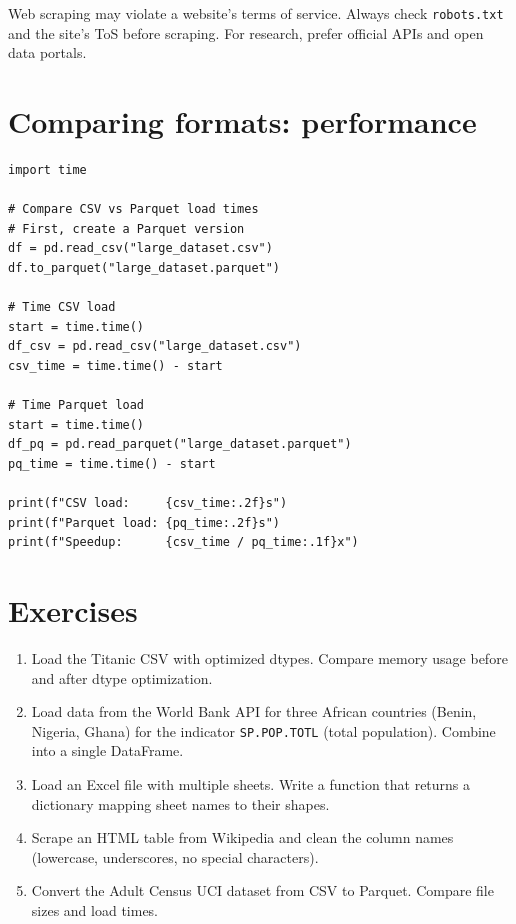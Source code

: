 \begin{warningbox}
Web scraping may violate a website's terms of service. Always check \texttt{robots.txt} and the site's ToS before scraping. For research, prefer official APIs and open data portals.
\end{warningbox}

\section{Comparing formats: performance}

\begin{verbatim}
import time

# Compare CSV vs Parquet load times
# First, create a Parquet version
df = pd.read_csv("large_dataset.csv")
df.to_parquet("large_dataset.parquet")

# Time CSV load
start = time.time()
df_csv = pd.read_csv("large_dataset.csv")
csv_time = time.time() - start

# Time Parquet load
start = time.time()
df_pq = pd.read_parquet("large_dataset.parquet")
pq_time = time.time() - start

print(f"CSV load:     {csv_time:.2f}s")
print(f"Parquet load: {pq_time:.2f}s")
print(f"Speedup:      {csv_time / pq_time:.1f}x")
\end{verbatim}

\section{Exercises}

\begin{exercise}
\begin{enumerate}
  \item Load the Titanic CSV with optimized dtypes. Compare memory usage before and after dtype optimization.
  \item Load data from the World Bank API for three African countries (Benin, Nigeria, Ghana) for the indicator \texttt{SP.POP.TOTL} (total population). Combine into a single DataFrame.
  \item Load an Excel file with multiple sheets. Write a function that returns a dictionary mapping sheet names to their shapes.
  \item Scrape an HTML table from Wikipedia and clean the column names (lowercase, underscores, no special characters).
  \item Convert the Adult Census UCI dataset from CSV to Parquet. Compare file sizes and load times.
\end{enumerate}
\end{exercise}

